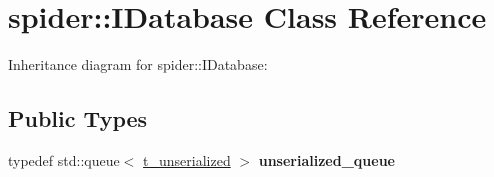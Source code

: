 \hypertarget{classspider_1_1_i_database}{}\section{spider\+:\+:I\+Database Class Reference}
\label{classspider_1_1_i_database}


Inheritance diagram for spider\+:\+:I\+Database\+:
\subsection*{Public Types}
\begin{DoxyCompactItemize}
\item 
\mbox{\label{classspider_1_1_i_database_af210e17b98b7d928ed5c71ba176b9f32}} 
typedef std\+::queue$<$ \hyperlink{structt__unserialized}{t\+\_\+unserialized} $>$ {\bfseries unserialized\+\_\+queue}
\end{DoxyCompactItemize}
